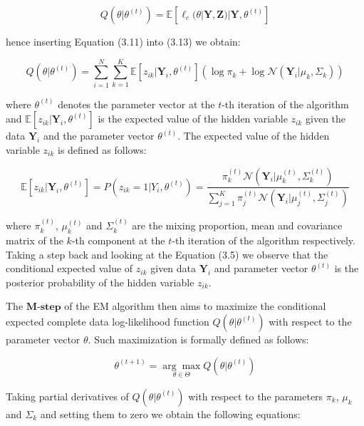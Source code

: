 \begin{equation}
    Q(\theta|\theta^{(t)}) = \mathbb{E}[\ell_c(\theta|\textbf{Y},\textbf{Z})|\textbf{Y},\theta^{(t)}]
\end{equation}

hence inserting Equation (3.11) into (3.13) we obtain:

\begin{equation}
    Q(\theta|\theta^{(t)}) = \sum_{i=1}^{N} \sum_{k=1}^{K} \mathbb{E}[z_{ik}|\textbf{Y}_i,\theta^{(t)}] \left(\log \pi_k + \log \mathcal{N}(\textbf{Y}_i|\mu_k,\Sigma_k)\right)
\end{equation}

where $\theta^{(t)}$ denotes the parameter vector at the $t$-th iteration of the algorithm and $\mathbb{E}[z_{ik}|\textbf{Y}_i,\theta^{(t)}]$ is the expected value of the hidden variable $z_{ik}$ given the data $\textbf{Y}_i$ and the parameter vector $\theta^{(t)}$.
The expected value of the hidden variable $z_{ik}$ is defined as follows:

\begin{equation} \label{eq:posterior_prob}
    \mathbb{E}[z_{ik}|\textbf{Y}_i,\theta^{(t)}] = P(z_{ik} = 1|Y_i,\theta^{(t)}) = \frac{\pi_k^{(t)} \mathcal{N}(\textbf{Y}_i|\mu_k^{(t)},\Sigma_k^{(t)})}{\sum_{j=1}^{K} \pi_j^{(t)} \mathcal{N}(\textbf{Y}_i|\mu_j^{(t)},\Sigma_j^{(t)})}
\end{equation}

where $\pi_k^{(t)}$, $\mu_k^{(t)}$ and $\Sigma_k^{(t)}$ are the mixing proportion, mean and covariance matrix of the $k$-th component at the $t$-th iteration of the algorithm respectively.
Taking a step back and looking at the Equation (3.5) we observe that the conditional expected value of $z_{ik}$ given data $\textbf{Y}_i$ 
and parameter vector $\theta^{(t)}$ is the posterior probability of the hidden variable $z_{ik}$.

The $\textbf{M-step}$ of the EM algorithm then aims to maximize the conditional expected complete data log-likelihood function $Q(\theta|\theta^{(t)})$ with respect to the parameter vector $\theta$.
Such maximization is formally defined as follows:

\begin{equation}
    \theta^{(t+1)} = \underset{\theta \in \Theta}{\arg\max} Q(\theta|\theta^{(t)})
\end{equation}

Taking partial derivatives of $Q(\theta|\theta^{(t)})$ with respect to the parameters $\pi_k$, $\mu_k$ and $\Sigma_k$ and setting them to zero we obtain the following equations:

